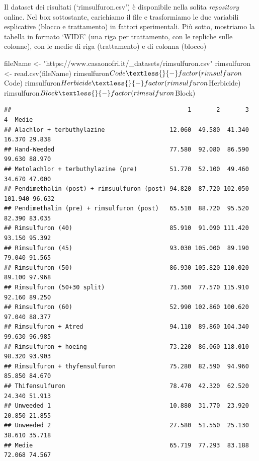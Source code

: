 \documentclass[a4paper,12pt,oneside]{book}
\newenvironment{Shaded}{\begin{snugshade}}{\end{snugshade}}
\newcommand{\SpecialCharTok}[1]{#1}
\newcommand{\StringTok}[1]{#1}
\newcommand{\OtherTok}[1]{#1}
\newcommand{\FunctionTok}[1]{#1}
\newcommand{\NormalTok}[1]{#1}
\begin{document}
Il dataset dei risultati (`rimsulfuron.csv') è disponibile nella solita \emph{repository} online. Nel box sottostante, carichiamo il file e trasformiamo le due variabili esplicative (blocco e trattamento) in fattori sperimentali. Più sotto, mostriamo la tabella in formato `WIDE' (una riga per trattamento, con le repliche sulle colonne), con le medie di riga (trattamento) e di colonna (blocco)

\begin{Shaded}
\begin{Highlighting}[]
\NormalTok{fileName }\OtherTok{\textless{}{-}} \StringTok{"https://www.casaonofri.it/\_datasets/rimsulfuron.csv"}
\NormalTok{rimsulfuron }\OtherTok{\textless{}{-}} \FunctionTok{read.csv}\NormalTok{(fileName)}
\NormalTok{rimsulfuron}\SpecialCharTok{$}\NormalTok{Code }\OtherTok{\textless{}{-}} \FunctionTok{factor}\NormalTok{(rimsulfuron}\SpecialCharTok{$}\NormalTok{Code)}
\NormalTok{rimsulfuron}\SpecialCharTok{$}\NormalTok{Herbicide }\OtherTok{\textless{}{-}} \FunctionTok{factor}\NormalTok{(rimsulfuron}\SpecialCharTok{$}\NormalTok{Herbicide)}
\NormalTok{rimsulfuron}\SpecialCharTok{$}\NormalTok{Block }\OtherTok{\textless{}{-}} \FunctionTok{factor}\NormalTok{(rimsulfuron}\SpecialCharTok{$}\NormalTok{Block)}
\end{Highlighting}
\end{Shaded}

\scriptsize

\begin{verbatim}
##                                                 1       2       3       4  Medie
## Alachlor + terbuthylazine                  12.060  49.580  41.340  16.370 29.838
## Hand-Weeded                                77.580  92.080  86.590  99.630 88.970
## Metolachlor + terbuthylazine (pre)         51.770  52.100  49.460  34.670 47.000
## Pendimethalin (post) + rimsuulfuron (post) 94.820  87.720 102.050 101.940 96.632
## Pendimethalin (pre) + rimsulfuron (post)   65.510  88.720  95.520  82.390 83.035
## Rimsulfuron (40)                           85.910  91.090 111.420  93.150 95.392
## Rimsulfuron (45)                           93.030 105.000  89.190  79.040 91.565
## Rimsulfuron (50)                           86.930 105.820 110.020  89.100 97.968
## Rimsulfuron (50+30 split)                  71.360  77.570 115.910  92.160 89.250
## Rimsulfuron (60)                           52.990 102.860 100.620  97.040 88.377
## Rimsulfuron + Atred                        94.110  89.860 104.340  99.630 96.985
## Rimsulfuron + hoeing                       73.220  86.060 118.010  98.320 93.903
## Rimsulfuron + thyfensulfuron               75.280  82.590  94.960  85.850 84.670
## Thifensulfuron                             78.470  42.320  62.520  24.340 51.913
## Unweeded 1                                 10.880  31.770  23.920  20.850 21.855
## Unweeded 2                                 27.580  51.550  25.130  38.610 35.718
## Medie                                      65.719  77.293  83.188  72.068 74.567
\end{verbatim}
\end{document}
